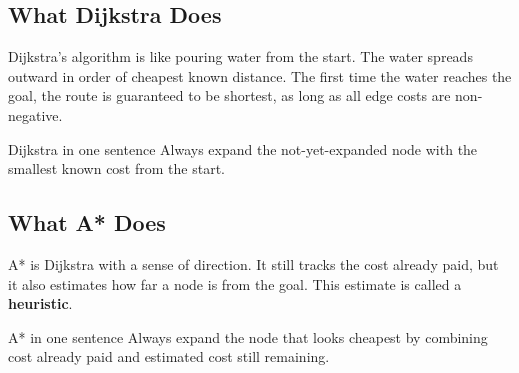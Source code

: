 \documentclass[11pt,a4paper]{article}
\newcommand{\nodecircle}[4]{
  \node[circle,draw=#3,fill=#3!12,minimum size=9mm,thick] (#1) at #2 {\small #4};
}
\begin{document}
\begin{center}
\end{center}

\subsection{What Dijkstra Does}

Dijkstra's algorithm is like pouring water from the start. The water spreads outward in order of cheapest known distance. The first time the water reaches the goal, the route is guaranteed to be shortest, as long as all edge costs are non-negative.

\begin{gentle}{Dijkstra in one sentence}
Always expand the not-yet-expanded node with the smallest known cost from the start.
\end{gentle}

\subsection{What A* Does}

A* is Dijkstra with a sense of direction. It still tracks the cost already paid, but it also estimates how far a node is from the goal. This estimate is called a \textbf{heuristic}.

\begin{gentle}{A* in one sentence}
Always expand the node that looks cheapest by combining cost already paid and estimated cost still remaining.
\end{gentle}
\end{document}
